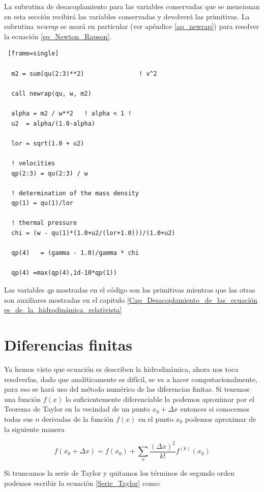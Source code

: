 \documentclass[12pt,a4paper]{book}
\begin{document}
La subrutina de desacoplamiento para las variables conservadas que se mencionan en esta sección recibirá las variables conservadas
y devolverá las primitivas. La subrutina \emph{newrap} se usará en particular 
(ver apéndice \ref{ap_newrap}) para resolver la ecuación \ref{eq_Newton_Rapson}.

\begin{lstlisting} [frame=single]
  
  m2 = sum(qu(2:3)**2)               ! v^2

  call newrap(qu, w, m2)

  alpha = m2 / w**2   ! alpha < 1 !
  u2  = alpha/(1.0-alpha)

  lor = sqrt(1.0 + u2)

  ! velocities
  qp(2:3) = qu(2:3) / w

  ! determination of the mass density
  qp(1) = qu(1)/lor

  ! thermal pressure
  chi = (w - qu(1)*(1.0+u2/(lor+1.0)))/(1.0+u2)

  qp(4)   = (gamma - 1.0)/gamma * chi

  qp(4) =max(qp(4),1d-10*qp(1))
\end{lstlisting}

Las variables \emph{qp} mostradas en el código son las primitivas mientras que las otras son auxiliares mostradas en el capitulo 
\ref{Cap_Desacoplamiento_de_las_ecuación  es_de_la_hidrodinámica_relativista}


\section{Diferencias finitas} \label{sec:Diferencias_finitas}
Ya hemos visto que ecuación  es describen la hidrodinámica, ahora nos toca resolverlas, dado que analíticamente es difícil, se va a hacer computacionalmente, para 
eso se hará uso del método numérico de las diferencias finitas.
Si tenemos una función $f(x)$ lo suficientemente diferenciable la podemos aproximar por el Teorema de Taylor  en la vecindad de un punto $x_0+\Delta x$ entonces si conocemos todas sus $n$ derivadas de la función $f(x)$ en el punto $x_0$ podemos aproximar de la siguiente manera

\begin{equation}\label{Serie_Taylor}
f\left( x_0 + \Delta x\right) = f\left( x_0 \right)+
\sum_n \frac{\left( \Delta x \right) ^2}{k!}f^{(k)} \left(x_0
\right)
\end{equation}

Si truncamos la serie de Taylor y quitamos los términos de segundo orden podemos escribir la ecuación \ref{Serie_Taylor} como:
\end{document}
